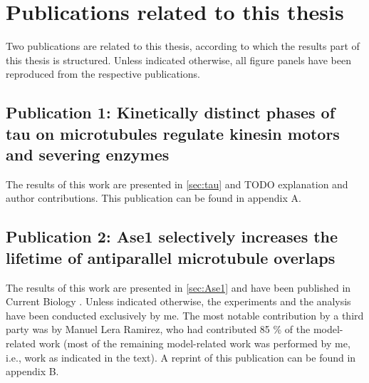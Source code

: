 \chapter{Publications related to this thesis}
\label{publications}
Two publications are related to this thesis, according to which the results part of this thesis is structured. Unless indicated otherwise, all figure panels have been reproduced from the respective publications.
\section{Publication 1: Kinetically distinct phases of tau on microtubules regulate kinesin motors and severing enzymes}
The results of this work are presented in \autoref{sec:tau} and 
TODO explanation and author contributions.
This publication can be found in appendix A.
\section{Publication 2: Ase1 selectively increases the lifetime of antiparallel microtubule overlaps}
The results of this work are presented in \autoref{sec:Ase1} and have been published in Current Biology \parencite{Krattenmacher2024}. Unless indicated otherwise, the experiments and the analysis have been conducted exclusively by me. The most notable contribution by a third party was by Manuel Lera Ramirez, who had contributed 85 \% of the model-related work (most of the remaining model-related work was performed by me, i.e., work as indicated in the text). A reprint of this publication can be found in appendix B.